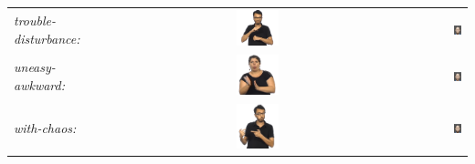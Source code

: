 \documentclass[../../main]{subfiles}
\begin{document}
\begin{longtable}{|l|c|r|}
    \emph{trouble-disturbance:} & \includegraphics[width=0.15\textwidth]{chapters/facial_expressions/images/original_facial_expressions/trouble_disturbance.png} & \includegraphics[width=0.15\textwidth]{chapters/facial_expressions/images/synthesized_expressions/trouble_disturbance.png} \\
    \emph{uneasy-awkward:} & \includegraphics[width=0.15\textwidth]{chapters/facial_expressions/images/original_facial_expressions/uneasy_awkward.png} & \includegraphics[width=0.15\textwidth]{chapters/facial_expressions/images/synthesized_expressions/uneasy_awkward.png} \\
    \emph{with-chaos:} & \includegraphics[width=0.15\textwidth]{chapters/facial_expressions/images/original_facial_expressions/with_chaos.png} & \includegraphics[width=0.15\textwidth]{chapters/facial_expressions/images/synthesized_expressions/with_chaos.png} \\

\end{longtable}
\end{document}
